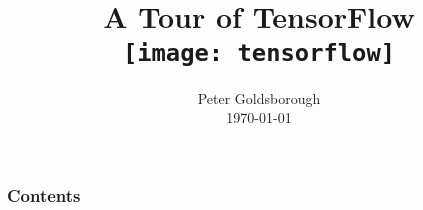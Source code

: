 





\begin{frame}
    \title{
      \vspace{1.2cm}\\
      A Tour of TensorFlow\\
      \vspace{1cm}
      \texttt{[image: tensorflow]}}
    \author{
      Peter Goldsborough \\
      \vspace{0.5cm}
      \today
    }
    \titlepage
\end{frame}


\begin{frame}
    \frametitle{Contents}
    \tableofcontents
\end{frame}


\setcounter{page}{1}












